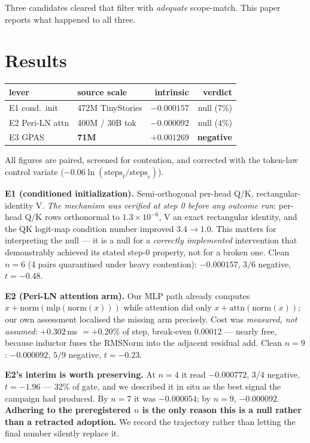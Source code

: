 \documentclass{article}
\begin{document}
Three candidates cleared that filter with \emph{adequate} scope-match. This paper reports what happened to all three.

\section{Results}
\begin{center}\begin{small}
\begin{tabular}{llrr}
\toprule
lever & source scale & intrinsic & verdict \\
\midrule
E1 cond.\ init & 472M TinyStories & $-0.000157$ & null (7\%) \\
E2 Peri-LN attn & 400M / 30B tok & $-0.000092$ & null (4\%) \\
E3 GPAS & \textbf{71M} & $+0.001269$ & \textbf{negative} \\
\bottomrule
\end{tabular}
\end{small}\end{center}

All figures are paired, screened for contention, and corrected with the token-law control variate ($-0.06\ln(\mathrm{steps}_t/\mathrm{steps}_c)$).

\textbf{E1 (conditioned initialization).} Semi-orthogonal per-head Q/K, rectangular-identity V. \emph{The mechanism was verified at step 0 before any outcome run}: per-head Q/K rows orthonormal to $1.3\times10^{-6}$, V an exact rectangular identity, and the QK logit-map condition number improved $3.4 \to 1.0$. This matters for interpreting the null --- it is a null for a \emph{correctly implemented} intervention that demonstrably achieved its stated step-0 property, not for a broken one. Clean $n{=}6$ (4 pairs quarantined under heavy contention): $-0.000157$, $3/6$ negative, $t=-0.48$.

\textbf{E2 (Peri-LN attention arm).} Our MLP path already computes $x + \mathrm{norm}(\mathrm{mlp}(\mathrm{norm}(x)))$ while attention did only $x + \mathrm{attn}(\mathrm{norm}(x))$; our own assessment localised the missing arm precisely. Cost was \emph{measured, not assumed}: $+0.302$\,ms $=+0.20\%$ of step, break-even $0.00012$ --- nearly free, because inductor fuses the RMSNorm into the adjacent residual add. Clean $n{=}9$: $-0.000092$, $5/9$ negative, $t=-0.23$.

\textbf{E2's interim is worth preserving.} At $n{=}4$ it read $-0.000772$, $3/4$ negative, $t=-1.96$ --- 32\% of gate, and we described it in situ as the best signal the campaign had produced. By $n{=}7$ it was $-0.000054$; by $n{=}9$, $-0.000092$. \textbf{Adhering to the preregistered $n$ is the only reason this is a null rather than a retracted adoption.} We record the trajectory rather than letting the final number silently replace it.
\end{document}
